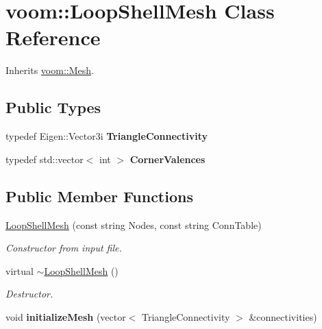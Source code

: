 \hypertarget{classvoom_1_1_loop_shell_mesh}{
\section{voom::LoopShellMesh Class Reference}
\label{classvoom_1_1_loop_shell_mesh}
}


Inherits \hyperlink{classvoom_1_1_mesh}{voom::Mesh}.\subsection*{Public Types}
\begin{DoxyCompactItemize}
\item 
\hypertarget{classvoom_1_1_loop_shell_mesh_a9ee7b059ee20c2329cdb525e480f9134}{
typedef Eigen::Vector3i {\bfseries TriangleConnectivity}}
\label{classvoom_1_1_loop_shell_mesh_a9ee7b059ee20c2329cdb525e480f9134}

\item 
\hypertarget{classvoom_1_1_loop_shell_mesh_a87b99bfc516f3e1df45ab3f9de23f68c}{
typedef std::vector$<$ int $>$ {\bfseries CornerValences}}
\label{classvoom_1_1_loop_shell_mesh_a87b99bfc516f3e1df45ab3f9de23f68c}

\end{DoxyCompactItemize}
\subsection*{Public Member Functions}
\begin{DoxyCompactItemize}
\item 
\hypertarget{classvoom_1_1_loop_shell_mesh_af08df0ac38084028572bd3fac7cc7798}{
\hyperlink{classvoom_1_1_loop_shell_mesh_af08df0ac38084028572bd3fac7cc7798}{LoopShellMesh} (const string Nodes, const string ConnTable)}
\label{classvoom_1_1_loop_shell_mesh_af08df0ac38084028572bd3fac7cc7798}

\begin{DoxyCompactList}\small\item\em Constructor from input file. \item\end{DoxyCompactList}\item 
virtual \hyperlink{classvoom_1_1_loop_shell_mesh_a5e541b0fc9ac4261737825a41e45f01c}{$\sim$LoopShellMesh} ()
\begin{DoxyCompactList}\small\item\em Destructor. \item\end{DoxyCompactList}\item 
\hypertarget{classvoom_1_1_loop_shell_mesh_ae0cdc92042d439bc33a7b1aee29b5196}{
void {\bfseries initializeMesh} (vector$<$ TriangleConnectivity $>$ \&connectivities)}
\label{classvoom_1_1_loop_shell_mesh_ae0cdc92042d439bc33a7b1aee29b5196}

\end{DoxyCompactItemize}

